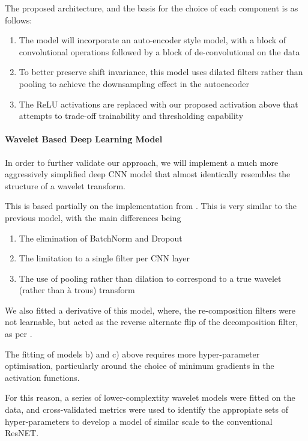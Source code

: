 \documentclass[9pt,conference]{IEEEtran}
\begin{document}
The proposed architecture, and the basis for the choice of each component is as follows:

\begin{enumerate}
    \item The model will incorporate an auto-encoder style model, with a block of convolutional operations followed by a block of de-convolutional on the data
    \item To better preserve shift invariance, this model uses dilated filters rather than pooling to achieve the downsampling effect in the autoencoder
    \item The ReLU activations are replaced with our proposed activation above that attempts to trade-off  trainability and thresholding capability
\end{enumerate}

\paragraph{\textbf{Wavelet Based Deep Learning Model}}

In order to further validate our approach, we will implement a much more aggressively simplified deep CNN model that almost identically resembles the structure of a wavelet transform.

This is based partially on the implementation from \cite{despawn}. This is very similar to the previous model, with the main differences being

\begin{enumerate}
    \item The elimination of BatchNorm and Dropout
    \item The limitation to a single filter per CNN layer
    \item The use of pooling rather than dilation to correspond to a true wavelet (rather than  à trous) transform
\end{enumerate}

We also fitted a derivative of this model, where, the re-composition filters were not learnable, but acted as the reverse alternate flip of the decomposition filter, as per \cite{despawn}.

The fitting of models b) and c) above requires more hyper-parameter optimisation, particularly around the choice of minimum gradients in the activation functions.

For this reason, a series of lower-complextity wavelet models were fitted on the data, and cross-validated metrics were used to identify the appropiate sets of hyper-parameters to develop a model of similar scale to the conventional ResNET.
\end{document}
